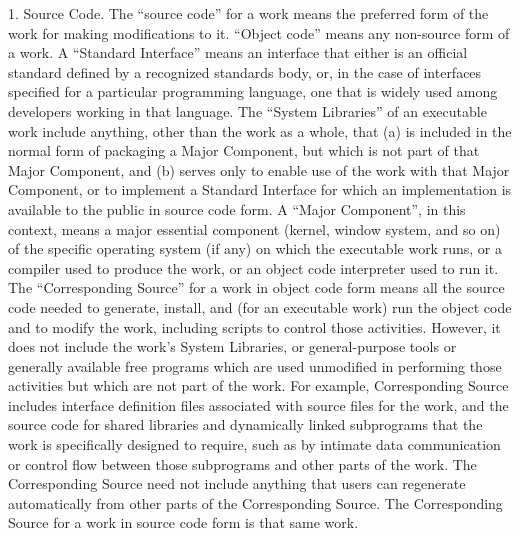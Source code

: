\documentclass {scrbook}
\begin{document}
\begin{tiny}
1. Source Code. The ``source code'' for a work means the preferred form of the work for making modifications to it. ``Object code'' means any non-source form of a work. A ``Standard Interface'' means an interface that either is an official standard defined by a recognized standards body, or, in the case of interfaces specified for a particular programming language, one that is widely used among developers working in that language. The ``System Libraries'' of an executable work include anything, other than the work as a whole, that (a) is included in the normal form of packaging a Major Component, but which is not part of that Major Component, and (b) serves only to enable use of the work with that Major Component, or to implement a Standard Interface for which an implementation is available to the public in source code form. A ``Major Component'', in this context, means a major essential component (kernel, window system, and so on) of the specific operating system (if any) on which the executable work runs, or a compiler used to produce the work, or an object code interpreter used to run it. The ``Corresponding Source'' for a work in object code form means all the source code needed to generate, install, and (for an executable work) run the object code and to modify the work, including scripts to control those activities. However, it does not include the work's System Libraries, or general-purpose tools or generally available free programs which are used unmodified in performing those activities but which are not part of the work. For example, Corresponding Source includes interface definition files associated with source files for the work, and the source code for shared libraries and dynamically linked subprograms that the work is specifically designed to require, such as by intimate data communication or control flow between those subprograms and other parts of the work. The Corresponding Source need not include anything that users can regenerate automatically from other parts of the Corresponding Source. The Corresponding Source for a work in source code form is that same work.


\end{tiny}
\end{document}

